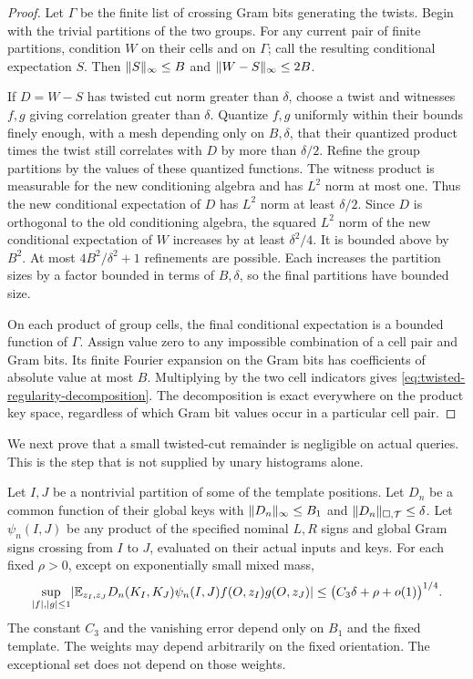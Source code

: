\begin{proof}
Let $\Gamma$ be the finite list of crossing Gram bits generating the
twists. Begin with the trivial partitions of the two groups. For any
current pair of finite partitions, condition $W$ on their cells and
on $\Gamma$; call the resulting conditional expectation $S$. Then
$\lVert S\rVert_\infty\le B$ and $\lVert W-S\rVert_\infty\le2B$.

If $D=W-S$ has twisted cut norm greater than $\delta$, choose a
twist and witnesses $f,g$ giving correlation greater than $\delta$.
Quantize $f,g$ uniformly within their bounds finely enough, with a
mesh depending only on $B,\delta$, that their quantized product times
the twist still correlates with $D$ by more than $\delta/2$. Refine
the group partitions by the values of these quantized functions.
The witness product is measurable for the new conditioning algebra
and has $L^2$ norm at most one. Thus the new conditional expectation
of $D$ has $L^2$ norm at least $\delta/2$. Since $D$ is orthogonal
to the old conditioning algebra, the squared $L^2$ norm of the new
conditional expectation of $W$ increases by at least $\delta^2/4$.
It is bounded above by $B^2$. At most $4B^2/\delta^2+1$
refinements are possible. Each increases the partition sizes by a
factor bounded in terms of $B,\delta$, so the final partitions have
bounded size.

On each product of group cells, the final conditional expectation is
a bounded function of $\Gamma$. Assign value zero to any impossible
combination of a cell pair and Gram bits. Its finite Fourier
expansion on the Gram bits has coefficients of absolute value at
most $B$. Multiplying by the two cell indicators gives
\eqref{eq:twisted-regularity-decomposition}. The decomposition is
exact everywhere on the product key space, regardless of which Gram
bit values occur in a particular cell pair.
\end{proof}

We next prove that a small twisted-cut remainder is negligible on
actual queries. This is the step that is not supplied by unary
histograms alone.

\begin{lemma}
\label{lem:product-terminal-remainder}
Let $I,J$ be a nontrivial partition of some of the template positions.
Let $D_n$ be a common function of their global keys with
$\lVert D_n\rVert_\infty\le B_1$ and
$\lVert D_n\rVert_{\square,\mathcal T}\le\delta$. Let $\psi_n(I,J)$
be any product of the specified nominal $L,R$ signs and global Gram
signs crossing from $I$ to $J$, evaluated on their actual inputs and
keys. For each fixed $\rho>0$, except on exponentially small mixed
mass,
\begin{equation}\label{eq:product-remainder-actual}
 \sup_{\lvert f\rvert,\lvert g\rvert\le1}
 \lvert \mathbb E_{z_I,z_J}D_n(K_I,K_J)\psi_n(I,J)f(O,z_I)g(O,z_J)\rvert
 \le\bigl(C_3\delta+\rho+o(1)\bigr)^{1/4}.
\end{equation}
The constant $C_3$ and the vanishing error depend only on $B_1$ and
the fixed template. The weights may depend arbitrarily on the fixed
orientation. The exceptional set does not depend on those weights.
\end{lemma}

